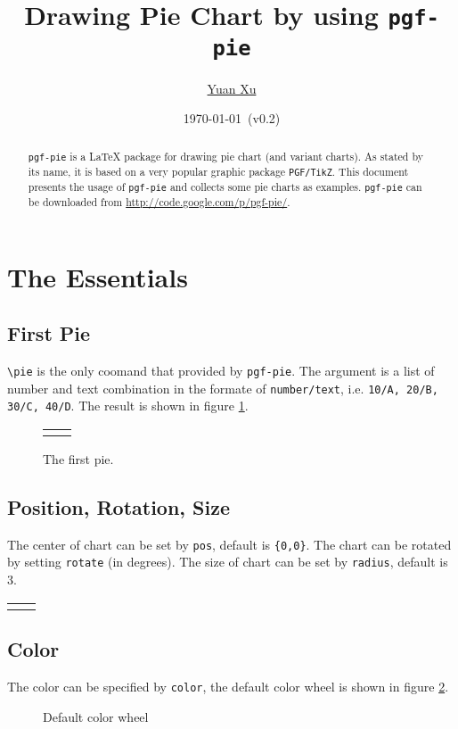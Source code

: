 \documentclass{article}
\newcommand{\demo}[2][1]{
  \begin{center}
  \begin{tabular}{cc}
    \begin{minipage}{.49\linewidth}
      \centering
      \resizebox{#1\linewidth}{!}{
        
      }
    \end{minipage}
    &
    \begin{minipage}{.45\linewidth}
      
    \end{minipage}
  \end{tabular}
  \end{center}
}
\begin{document}
\title{Drawing Pie Chart by using \texttt{pgf-pie}}
\author{\href{mailto:xuyuan.cn@gmail.com}{Yuan Xu}}
\date{\today{}~(v0.2)}
\maketitle

\begin{abstract}
  \texttt{pgf-pie} is a LaTeX package for drawing pie chart (and
  variant charts). As stated by its name, it is based on a very
  popular graphic package \texttt{PGF/TikZ}. This document presents
  the usage of \texttt{pgf-pie} and collects some pie charts as
  examples. \texttt{pgf-pie} can be downloaded from
  \href{http://code.google.com/p/pgf-pie/}{http://code.google.com/p/pgf-pie/}.
\end{abstract}

\tableofcontents

\section{The Essentials}

\subsection{First Pie}
\lstinline|\pie| is the only coomand that provided by
\texttt{pgf-pie}. The argument is a list of number and text
combination in the formate of \texttt{number/text}, i.e. \texttt{10/A,
  20/B, 30/C, 40/D}. The result is shown in figure \ref{fig:first-pie}.
\begin{figure}
  \centering
  \demo[0.6]{first-pie}
  \caption{The first pie.}
  \label{fig:first-pie}
\end{figure}

\subsection{Position, Rotation, Size}

The center of chart can be set by \texttt{pos}, default is
\texttt{\{0,0\}}. The chart can be rotated by setting \texttt{rotate}
(in degrees). The size of chart can be set by \texttt{radius}, default
is 3.

\demo{radius}

\subsection{Color}
The color can be specified by \texttt{color}, the default color wheel
is shown in figure \ref{fig:color-wheel}.
\begin{figure}
  \centering
  
  \caption{Default color wheel}
  \label{fig:color-wheel}
\end{figure}
\end{document}
